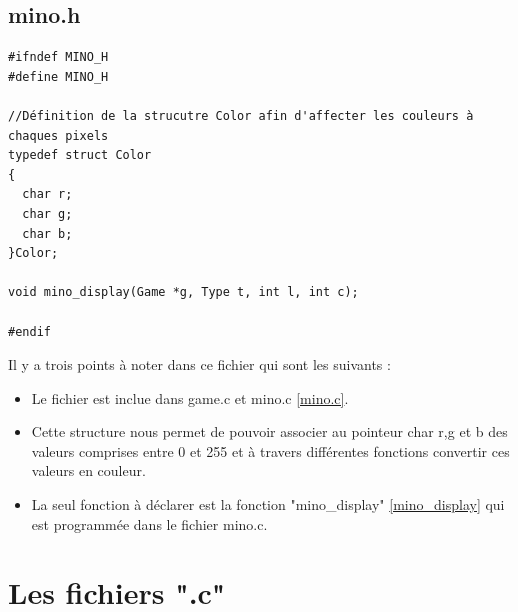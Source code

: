 \documentclass[a4paper,10p]{report}
\begin{document}
\section{mino.h}
\label{mino.h}
\begin{lstlisting}
#ifndef MINO_H
#define MINO_H

//Définition de la strucutre Color afin d'affecter les couleurs à chaques pixels
typedef struct Color
{
  char r;
  char g;
  char b;
}Color;

void mino_display(Game *g, Type t, int l, int c);

#endif
\end{lstlisting}
Il y a trois points à noter dans ce fichier qui sont les suivants :
\begin{itemize}
\item Le fichier est inclue dans game.c et mino.c \ref{mino.c}.
\item Cette structure nous permet de pouvoir associer au pointeur char r,g et b des valeurs comprises entre 0 et 255 et à travers différentes fonctions convertir ces valeurs en couleur.
\item La seul fonction à déclarer est la fonction "mino\_display" \ref{mino_display}
qui est programmée dans le fichier mino.c.
\end{itemize}

\chapter{Les fichiers ".c"}
\end{document}
